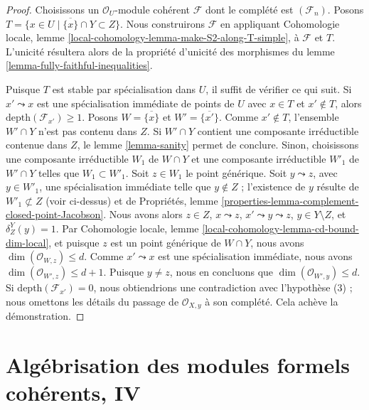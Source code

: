 \begin{proof}
Choisissons un $\mathcal{O}_U$-module cohérent $\mathcal{F}$ dont le
complété est $(\mathcal{F}_n)$. Posons
$T = \{x \in U \mid \overline{\{x\}} \cap Y \subset Z\}$.
Nous construirons $\mathcal{F}$ en appliquant Cohomologie locale,
lemme \ref{local-cohomology-lemma-make-S2-along-T-simple},
à $\mathcal{F}$ et $T$.
L'unicité résultera alors de la propriété d'unicité des morphismes
du lemme \ref{lemma-fully-faithful-inequalities}.

\medskip\noindent
Puisque $T$ est stable par spécialisation dans $U$, il suffit de
vérifier ce qui suit. Si $x' \leadsto x$ est une
spécialisation immédiate de points de $U$ avec $x \in T$
et $x' \not \in T$, alors $\text{depth}(\mathcal{F}_{x'}) \geq 1$.
Posons $W = \overline{\{x\}}$ et $W' = \overline{\{x'\}}$.
Comme $x' \not \in T$, l'ensemble $W' \cap Y$ n'est pas contenu dans $Z$.
Si $W' \cap Y$ contient une composante irréductible contenue dans $Z$,
le lemme \ref{lemma-sanity} permet de conclure.
Sinon, choisissons une composante irréductible $W_1$ de $W \cap Y$ et
une composante irréductible $W'_1$ de $W' \cap Y$ telles que $W_1 \subset W'_1$.
Soit $z \in W_1$ le point générique. Soit $y \leadsto z$, avec $y \in W'_1$,
une spécialisation immédiate telle que $y \not \in Z$ ; l'existence de $y$
résulte de $W'_1 \not \subset Z$ (voir ci-dessus) et de
Propriétés, lemme \ref{properties-lemma-complement-closed-point-Jacobson}.
Nous avons alors $z \in Z$, $x \leadsto z$,
$x' \leadsto y \leadsto z$, $y \in Y \setminus Z$, et $\delta^Y_Z(y) = 1$.
Par Cohomologie locale, lemme \ref{local-cohomology-lemma-cd-bound-dim-local},
et puisque $z$
est un point générique de $W \cap Y$, nous avons
$\dim(\mathcal{O}_{W, z}) \leq d$.
Comme $x' \leadsto x$ est une spécialisation immédiate, nous avons
$\dim(\mathcal{O}_{W', z}) \leq d + 1$.
Puisque $y \not = z$, nous en concluons que
$\dim(\mathcal{O}_{W', y}) \leq d$.
Si $\text{depth}(\mathcal{F}_{x'}) = 0$, nous obtiendrions
une contradiction avec l'hypothèse (3) ; nous omettons les détails du passage
de $\mathcal{O}_{X, y}$ à son complété.
Cela achève la démonstration.
\end{proof}








\section{Algébrisation des modules formels cohérents, IV}
\label{section-algebraization-modules-local}

